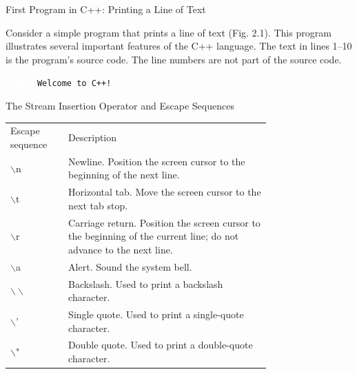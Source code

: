 \documentclass[10pt]{beamer}
\begin{document}
\begin{frame}{\small First Program in C++: Printing a Line of Text}
	
	Consider a simple program that prints a line of text (Fig. 2.1). This program illustrates several important features of the C++ language. The text in lines 1–10 is the program’s source code. The line numbers are not part of the source code.
	
	
	
	\begin{block}{\textcolor{white}{output}}
		\texttt{\small Welcome to C++!}
	\end{block}
	
\end{frame}


\begin{frame}{\small The Stream Insertion Operator and Escape Sequences}
	\centering\tiny\renewcommand{\arraystretch}{2}	
\begin{tabular}{p{0.15\linewidth} p{0.6\linewidth}}
	\rowcolor{cyan}\color{white} Escape sequence & \color{white} Description \\
	
	\rowcolor{lightcyan} $\backslash$n & Newline. Position the screen cursor to the beginning of the next line.\\ 
	
	\rowcolor{lightcyan} $\backslash$t & Horizontal tab. Move the screen cursor to the next tab stop.\\ 
	
	\rowcolor{lightcyan} $\backslash$r & Carriage return. Position the screen cursor to the beginning of the current line; do not advance to the next line.\\ 
	
	\rowcolor{lightcyan} $\backslash$a & Alert. Sound the system bell.\\ 
	
	\rowcolor{lightcyan} $\backslash\backslash$ & Backslash. Used to print a backslash character.\\ 
	
	\rowcolor{lightcyan} $\backslash$' & Single quote. Used to print a single-quote character.\\ 
	
	\rowcolor{lightcyan} $\backslash$" & Double quote. Used to print a double-quote character.
\end{tabular}
\end{frame}
\end{document}
